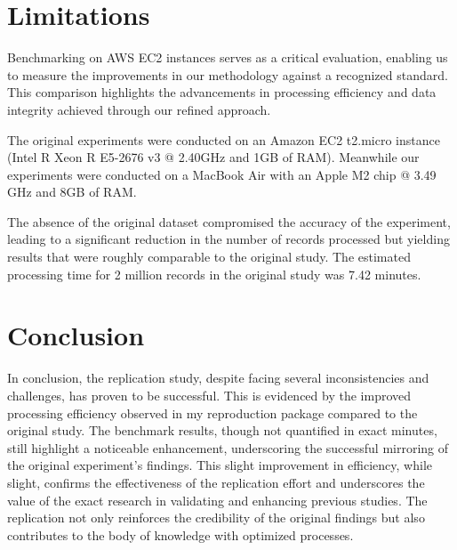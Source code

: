 \documentclass[sigconf, nonacm]{acmart}
\begin{document}
\section{\textbf{Limitations}}

Benchmarking on  AWS EC2 instances serves as a critical evaluation, enabling us to measure the improvements in our methodology against a recognized standard. This comparison highlights the advancements in processing efficiency and data integrity achieved through our refined approach.

The original experiments were conducted on an Amazon EC2 t2.micro instance (Intel R Xeon R E5-2676 v3 @ 2.40GHz and 1GB of RAM). Meanwhile our experiments were conducted on a MacBook Air with an Apple M2 chip @ 3.49 GHz and 8GB of RAM.

The absence of the original dataset compromised the accuracy of the experiment, leading to a significant reduction in the number of records processed but yielding results that were roughly comparable to the original study. The estimated processing time for 2 million records in the original study was 7.42 minutes.



\section{\textbf{Conclusion }}

In conclusion, the replication study, despite facing several inconsistencies and challenges, has proven to be successful. This is evidenced by the improved processing efficiency observed in my reproduction package compared to the original study. The benchmark results, though not quantified in exact minutes, still highlight a noticeable enhancement, underscoring the successful mirroring of the original experiment's findings. This slight improvement in efficiency, while slight, confirms the effectiveness of the replication effort and underscores the value of the exact research in validating and enhancing previous studies. The replication not only reinforces the credibility of the original findings but also contributes to the body of knowledge with optimized processes.







\end{document}

